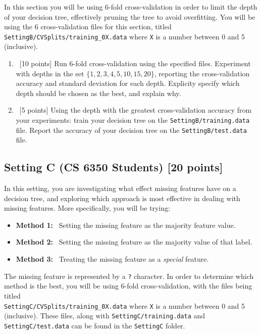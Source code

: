 \begin{enumerate}
  In this section you will be using 6-fold cross-validation in order to limit the depth of your decision tree, effectively pruning the tree to avoid overfitting. You will be using the 6 cross-validation files for this section, titled \texttt{SettingB/CVSplits/training\_0X.data} where \texttt{X} is a number between 0 and 5 (inclusive). 
  
  \begin{enumerate}
  \item ~[10 points] Run 6-fold cross-validation using the specified files. Experiment with depths in the set $\{1,2,3,4,5,10,15,20\}$, reporting the cross-validation accuracy and standard deviation for each depth. Explicity specify which depth should be chosen as the best, and explain why. 
    
  \item ~[5 points]  Using the depth with the greatest cross-validation accuracy from your experiments: train your decision tree on the \texttt{SettingB/training.data} file. Report the accuracy of your decision tree on the \texttt{SettingB/test.data} file. 	
  \end{enumerate}
  
\end{enumerate}

\subsection*{Setting C (CS 6350 Students) [20 points]}

In this setting, you are investigating what effect missing features have on a decision tree, and exploring which approach is most effective in dealing with missing features. More specifically, you will be trying:
\begin{itemize}
\item \textbf{Method 1:} ~Setting the missing feature as the majority feature value.
\item \textbf{Method 2:} ~Setting the missing feature as the majority value of that label. 
\item \textbf{Method 3:} ~Treating the missing feature as a \textit{special} feature.
\end{itemize}
The missing feature is represented by a \texttt{?} character. In order to determine which method is the best, you will be using 6-fold cross-validation, with the files being titled\\ \texttt{SettingC/CVSplits/training\_0X.data} where \texttt{X} is a number between 0 and 5 (inclusive). These files, along with \texttt{SettingC/training.data} and \texttt{SettingC/test.data} can be found in the \texttt{SettingC} folder. 


